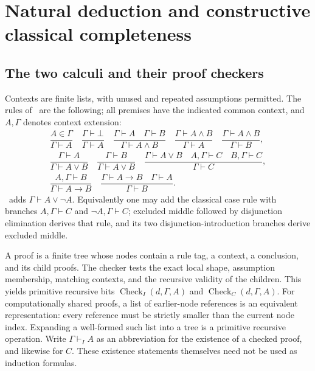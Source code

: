 \section{Natural deduction and constructive classical completeness}\label{sec:nd}

\subsection{The two calculi and their proof checkers}

Contexts are finite lists, with unused and repeated assumptions permitted.
The rules of \IPC\ are the following; all premises have the indicated common
context, and $A,\Gamma$ denotes context extension:
\[
\begin{gathered}
 \dfrac{A\in\Gamma}{\Gamma\vdash A}\quad
 \dfrac{\Gamma\vdash\bot}{\Gamma\vdash A}\quad
 \dfrac{\Gamma\vdash A\quad\Gamma\vdash B}{\Gamma\vdash A\wedge B}\quad
 \dfrac{\Gamma\vdash A\wedge B}{\Gamma\vdash A}\quad
 \dfrac{\Gamma\vdash A\wedge B}{\Gamma\vdash B},\\[5pt]
 \dfrac{\Gamma\vdash A}{\Gamma\vdash A\vee B}\quad
 \dfrac{\Gamma\vdash B}{\Gamma\vdash A\vee B}\quad
 \dfrac{\Gamma\vdash A\vee B\quad A,\Gamma\vdash C\quad B,\Gamma\vdash C}
       {\Gamma\vdash C},\\[5pt]
 \dfrac{A,\Gamma\vdash B}{\Gamma\vdash A\to B}\quad
 \dfrac{\Gamma\vdash A\to B\quad\Gamma\vdash A}{\Gamma\vdash B}.
\end{gathered}
\]
\CPC\ adds $\Gamma\vdash A\vee\neg A$. Equivalently one may add the
classical case rule with branches $A,\Gamma\vdash C$ and
$\neg A,\Gamma\vdash C$; excluded middle followed by disjunction elimination
derives that rule, and its two disjunction-introduction branches derive
excluded middle.

A proof is a finite tree whose nodes contain a rule tag, a context, a
conclusion, and its child proofs. The checker tests the exact local shape,
assumption membership, matching contexts, and the recursive validity of
the children. This yields primitive recursive bits
$\operatorname{Check}_I(d,\Gamma,A)$ and
$\operatorname{Check}_C(d,\Gamma,A)$. For computationally shared proofs,
a list of earlier-node references is an equivalent representation: every
reference must be strictly smaller than the current node index. Expanding
a well-formed such list into a tree is a primitive recursive operation.
Write $\Gamma\vdash_I A$ as an abbreviation for the existence of a checked
proof, and likewise for $C$. These existence statements themselves need
not be used as induction formulas.

